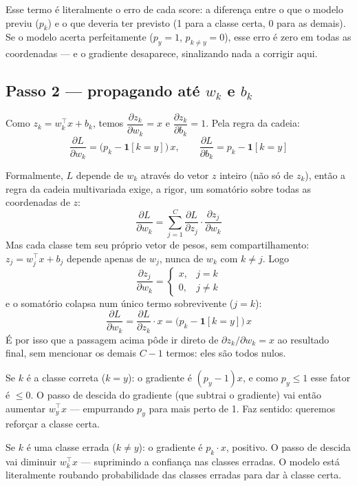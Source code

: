 \documentclass[11pt]{article}
\begin{document}
\begin{intuicao}
Esse termo é literalmente o erro de cada score: a diferença entre o que o modelo previu ($p_k$) e o que deveria ter previsto (1 para a classe certa, 0 para as demais). Se o modelo acerta perfeitamente ($p_y=1$, $p_{k\neq y}=0$), esse erro é zero em todas as coordenadas --- e o gradiente desaparece, sinalizando nada a corrigir aqui.
\end{intuicao}

\subsection*{Passo 2 --- propagando até $w_k$ e $b_k$}

Como $z_k = w_k^\top x + b_k$, temos $\dfrac{\partial z_k}{\partial w_k} = x$ e $\dfrac{\partial z_k}{\partial b_k} = 1$. Pela regra da cadeia:
$$
\frac{\partial L}{\partial w_k} = \big(p_k - \mathbf{1}[k=y]\big)\, x, \qquad
\frac{\partial L}{\partial b_k} = p_k - \mathbf{1}[k=y]
$$

\begin{curiosos}
Formalmente, $L$ depende de $w_k$ através do vetor $z$ inteiro (não só de $z_k$), então a regra da cadeia multivariada exige, a rigor, um somatório sobre todas as coordenadas de $z$:
$$
\frac{\partial L}{\partial w_k} = \sum_{j=1}^{C} \frac{\partial L}{\partial z_j}\cdot\frac{\partial z_j}{\partial w_k}
$$
Mas cada classe tem seu próprio vetor de pesos, sem compartilhamento: $z_j = w_j^\top x + b_j$ depende apenas de $w_j$, nunca de $w_k$ com $k\neq j$. Logo
$$
\frac{\partial z_j}{\partial w_k} = \begin{cases} x, & j=k \\ 0, & j\neq k \end{cases}
$$
e o somatório colapsa num único termo sobrevivente ($j=k$):
$$
\frac{\partial L}{\partial w_k} = \frac{\partial L}{\partial z_k}\cdot x = \big(p_k - \mathbf{1}[k=y]\big)\,x
$$
É por isso que a passagem acima pôde ir direto de $\partial z_k/\partial w_k = x$ ao resultado final, sem mencionar os demais $C-1$ termos: eles são todos nulos.
\end{curiosos}

\begin{intuicao}
Se $k$ é a classe correta ($k=y$): o gradiente é $(p_y - 1)x$, e como $p_y \le 1$ esse fator é $\le 0$. O passo de descida do gradiente (que subtrai o gradiente) vai então aumentar $w_y^\top x$ --- empurrando $p_y$ para mais perto de 1. Faz sentido: queremos reforçar a classe certa.

Se $k$ é uma classe errada ($k\neq y$): o gradiente é $p_k \cdot x$, positivo. O passo de descida vai diminuir $w_k^\top x$ --- suprimindo a confiança nas classes erradas. O modelo está literalmente roubando probabilidade das classes erradas para dar à classe certa.
\end{intuicao}
\end{document}
